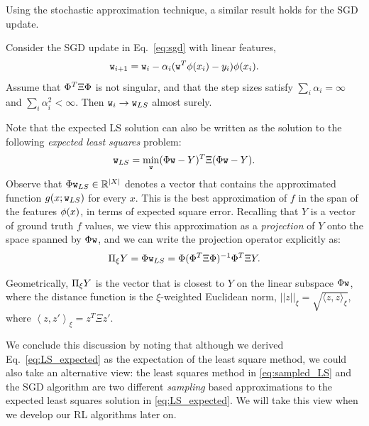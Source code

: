 Using the stochastic approximation technique, a similar result holds for the SGD update.
\begin{proposition}
Consider the SGD update in Eq.~\eqref{eq:sgd} with linear features, 
$$
{\tt w}_{i+1} = {\tt w}_i - \alpha_i ( {\tt w}^T \phi(x_i) - y_i)\phi(x_i).
$$
Assume that $\Phi^T \Xi \Phi$ is not singular, and that the step sizes satisfy $\sum_i \alpha_i = \infty$ and $\sum_i \alpha_i^2 < \infty$. Then ${\tt w}_{i} \to {\tt w}_{LS}$ almost surely. 
\end{proposition}

Note that the expected LS solution can also be written as the solution to the following \textit{expected least squares} problem:
\begin{equation}\label{eq:LS_expected}
{\tt w}_{LS} = \min_{\tt w} (\Phi {\tt w} - Y)^T \Xi (\Phi {\tt w} - Y).
\end{equation}
Observe that $\Phi {\tt w}_{LS} \in \mathbb{R}^{|X|}$ denotes a vector that contains the approximated function $g(x;{\tt w}_{LS})$ for every $x$. 
This is the best approximation of $f$ in the span of the features $\phi(x)$, in terms of expected square error. Recalling that $Y$ is a vector of ground truth $f$ values, we view this approximation as a \emph{projection} of $Y$ onto the space spanned by $\Phi {\tt w}$, and we can write the projection operator explicitly as:
$$
\Pi_\xi Y = \Phi {\tt w}_{LS} = \Phi (\Phi^T \Xi \Phi)^{-1} \Phi^T \Xi Y.
$$

Geometrically, $\Pi_\xi Y$ is the vector that is closest to $Y$ on the linear subspace $\Phi {\tt w}$, where the distance function is the $\xi$-weighted Euclidean norm, $||z||_\xi = \sqrt{\langle z,z\rangle_\xi}$, where $\left\langle z, z' \right \rangle_\xi = z^T \Xi z'$.

We conclude this discussion by noting that although we derived Eq.~\eqref{eq:LS_expected} as the expectation of the least square method, we could also take an alternative view: the least squares method in \eqref{eq:sampled_LS} and the SGD algorithm are two different \textit{sampling} based approximations to the expected least squares solution in \eqref{eq:LS_expected}. We will take this view when we develop our RL algorithms later on.



